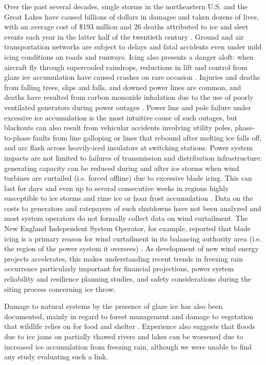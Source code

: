 \documentclass[twocol]{ametsoc}
\begin{document}
Over the past several decades, single storms in the northeastern U.S. and the Great Lakes have caused billions of dollars in damages and taken dozens of lives, with an average cost of \$193 million and 26 deaths attributed to ice and sleet events each year in the latter half of the twentieth century \citep{lott2006tracking, changnon2006severe, ncei2019storm}. Ground and air transportation networks are subject to delays and fatal accidents even under mild icing conditions on roads and runways. Icing also presents a danger aloft: when aircraft fly through supercooled raindrops, reductions in lift and control from glaze ice accumulation have caused crashes on rare occasion \citep{bernstein2000freezing}. Injuries and deaths from falling trees, slips and falls, and downed power lines are common, and deaths have resulted from carbon monoxide inhalation due to the use of poorly ventilated generators during power outages \citep{daley2000outbreak}. Power line and pole failure under excessive ice accumulation is the most intuitive cause of such outages, but blackouts can also result from vehicular accidents involving utility poles, phase-to-phase faults from line galloping or lines that rebound after melting ice falls off, and arc flash across heavily-iced insulators at switching stations. Power system impacts are not limited to failures of transmission and distribution infrastructure: generating capacity can be reduced during and after ice storms when wind turbines are curtailed (i.e. forced offline) due to excessive blade icing. This can last for days and even up to several consecutive weeks in regions highly susceptible to ice storms and rime ice or hoar frost accumulation \citep{davis2014forecast}. Data on the costs to generators and ratepayers of such shutdowns have not been analyzed and most system operators do not formally collect data on wind curtailment. The New England Independent System Operator, for example, reported that blade icing is a primary reason for wind curtailment in its balancing authority area (i.e. the region of the power system it oversees) \citep{bird2014wind}. As development of new wind energy projects accelerates, this makes understanding recent trends in freezing rain occurrence particularly important for financial projections, power system reliability and resilience planning studies, and safety considerations during the siting process concerning ice throw. 

Damage to natural systems by the presence of glaze ice has also been documented, mainly in regard to forest management and damage to vegetation that wildlife relies on for food and shelter \citep{pellikka2000modelling,proulx2001relationship}. Experience also suggests that floods due to ice jams on partially thawed rivers and lakes can be worsened due to increased ice accumulation from freezing rain, although we were unable to find any study evaluating such a link. 
\end{document}
